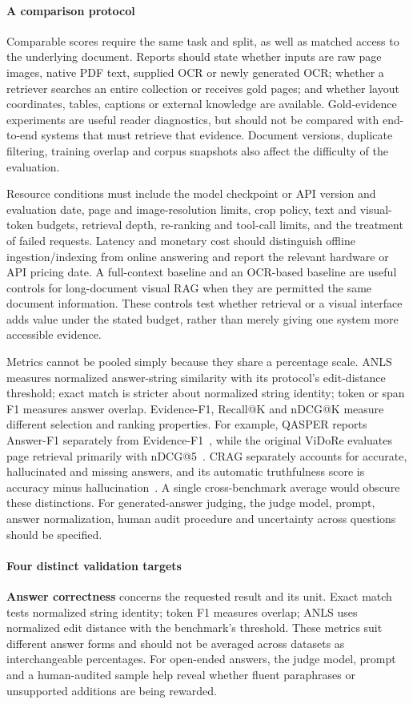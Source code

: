\paragraph{A comparison protocol}
Comparable scores require the same task and split, as well as matched access to the underlying document. Reports should state whether inputs are raw page images, native PDF text, supplied OCR or newly generated OCR; whether a retriever searches an entire collection or receives gold pages; and whether layout coordinates, tables, captions or external knowledge are available. Gold-evidence experiments are useful reader diagnostics, but should not be compared with end-to-end systems that must retrieve that evidence. Document versions, duplicate filtering, training overlap and corpus snapshots also affect the difficulty of the evaluation.

Resource conditions must include the model checkpoint or API version and evaluation date, page and image-resolution limits, crop policy, text and visual-token budgets, retrieval depth, re-ranking and tool-call limits, and the treatment of failed requests. Latency and monetary cost should distinguish offline ingestion/indexing from online answering and report the relevant hardware or API pricing date. A full-context baseline and an OCR-based baseline are useful controls for long-document visual RAG when they are permitted the same document information. These controls test whether retrieval or a visual interface adds value under the stated budget, rather than merely giving one system more accessible evidence.

Metrics cannot be pooled simply because they share a percentage scale. ANLS measures normalized answer-string similarity with its protocol's edit-distance threshold; exact match is stricter about normalized string identity; token or span F1 measures answer overlap. Evidence-F1, Recall@K and nDCG@K measure different selection and ranking properties. For example, QASPER reports Answer-F1 separately from Evidence-F1~\cite{infoseekqa2021}, while the original ViDoRe evaluates page retrieval primarily with nDCG@5~\cite{faysse2024colpali}. CRAG separately accounts for accurate, hallucinated and missing answers, and its automatic truthfulness score is accuracy minus hallucination~\cite{crag2024}. A single cross-benchmark average would obscure these distinctions. For generated-answer judging, the judge model, prompt, answer normalization, human audit procedure and uncertainty across questions should be specified.

\paragraph{Four distinct validation targets}
\textbf{Answer correctness} concerns the requested result and its unit. Exact match tests normalized string identity; token F1 measures overlap; ANLS uses normalized edit distance with the benchmark's threshold. These metrics suit different answer forms and should not be averaged across datasets as interchangeable percentages. For open-ended answers, the judge model, prompt and a human-audited sample help reveal whether fluent paraphrases or unsupported additions are being rewarded.

